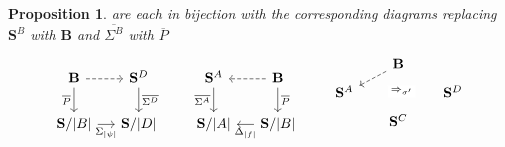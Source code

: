 \documentclass[11pt, oneside, article]{memoir}
\theoremstyle{plain}
\newtheorem{proposition}[theorem]{Proposition}
\theoremstyle{definition}
\theoremstyle{remark}
\DeclarePairedDelimiter{\abs}{\lvert}{\rvert}
\newcommand{\cat}[1]{\mathbf{#1}}
\newcommand{\CoalgOn}[2]{{#2}^{#1}}
\newcommand{\CoalgS}[1]{\CoalgOn{#1}{\bS}}
\newcommand{\pts}[1]{{\abs{#1}}}
\newcommand{\one}[1]{\pts{#1}}
\newcommand{\ptlift}[1]{\overline{#1}}
\newcommand{\carr}{\Sigma}
\newcommand{\leindex}[1]{\Sigma_{#1}}
\newcommand{\reindex}[1]{\Delta_{#1}}
\newcommand{\car}[1]{\carr^{#1}}
\newcommand{\carA}{\car{\cA}}
\newcommand{\carB}{\car{\cB}}
\newcommand{\carC}{\car{\cC}}
\newcommand{\carD}{\car{\cD}}
\newcommand{\ph}[1]{#1}
\newcommand{\com}[2]{{#1}^{#2}}
\newcommand{\con}[2]{{#1}^{#2}}
\newcommand{\cmnd}[1]{{#1}}
\newcommand{\cA}{\cmnd{A}}
\newcommand{\cB}{\cmnd{B}}
\newcommand{\cC}{\cmnd{C}}
\newcommand{\cD}{\cmnd{D}}
\newcommand{\bB}{\cat{B}}
\newcommand{\bS}{\cat{S}}
\newcommand{\pP}{\ph{P}}
\newcommand{\AS}{\CoalgS{\cA}}
\newcommand{\BS}{\CoalgS{\cB}}
\newcommand{\CS}{\CoalgS{\cC}}
\newcommand{\DS}{\CoalgS{\cD}}
\newcommand{\SA}{\bS/\pts{\cA}}
\newcommand{\SB}{\bS/\pts{\cB}}
\newcommand{\SC}{\bS/\pts{\cC}}
\newcommand{\SD}{\bS/\pts{\cD}}
\begin{document}
\begin{proposition}
  are each in bijection with the corresponding diagrams replacing
  $\BS$ with $\bB$ and $\ptlift{\carB}$ with $\ptlift{\pP}$
  \[
    \begin{tikzcd}[column sep=12.5]
      \bB & \DS \\
      {\SB} & {\SD}
      \arrow[dashed, from=1-1, to=1-2]
      \arrow["{\ptlift{\pP}}"', from=1-1, to=2-1]
      \arrow["{\ptlift{\carD}}", from=1-2, to=2-2]
      \arrow["{\leindex{\one{\psi}}}"', from=2-1, to=2-2]
    \end{tikzcd}
    \qquad
    \begin{tikzcd}[column sep=12.5]
      \AS & \bB \\
      {\SA} & {\SB}
      \arrow["\ptlift{\carA}"', from=1-1, to=2-1]
      \arrow[dashed, from=1-2, to=1-1]
      \arrow["\ptlift{\pP}", from=1-2, to=2-2]
      \arrow["{\reindex{\one{f}}}", from=2-2, to=2-1]
    \end{tikzcd}
    \qquad
    \begin{tikzcd}[column sep=17, row sep=5]
      & \bB & \\
      \AS && \DS \\
      & \CS & \\
      \arrow[dashed, from=1-2, to=2-1]
      \arrow["{\Rightarrow_{\sigma'}}"{description}, shift left, draw=none, from=1-2, to=3-2]

\end{tikzcd}\]
\end{proposition}
\end{document}
